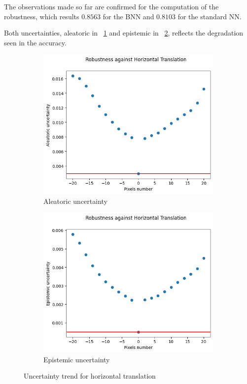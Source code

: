 The observations made so far are confirmed for the computation of the robustness, which results $0.8563$ for the BNN and $0.8103$ for the standard NN.

Both uncertainties, aleatoric in \Fig~\ref{fig:ht_aleatoric} and epistemic in \Fig~\ref{fig:ht_epistemic}, reflects the degradation seen in the accuracy.

\begin{figure}[h]
	\centering
	\begin{subfigure}{.5\textwidth}
		\centering
		\includegraphics[width=0.8\linewidth]{ImageFiles/EvalBNN/HT/aleatoric}
		\caption{Aleatoric uncertainty}
		\label{fig:ht_aleatoric}
	\end{subfigure}%
	\begin{subfigure}{.5\textwidth}
		\centering
		\includegraphics[width=0.8\linewidth]{ImageFiles/EvalBNN/HT/epistemic}
		\caption{Epistemic uncertainty}
		\label{fig:ht_epistemic}
	\end{subfigure}
	\caption{Uncertainty trend for horizontal translation}
	\label{fig:ht_uncertainty}
\end{figure}

